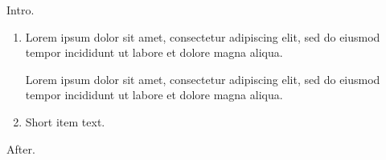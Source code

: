 \documentclass[10pt]{article}
\begin{document}
Intro.
\begin{enumerate}
\item Lorem ipsum dolor sit amet, consectetur adipiscing elit, sed do eiusmod tempor incididunt ut labore et dolore magna aliqua.

Lorem ipsum dolor sit amet, consectetur adipiscing elit, sed do eiusmod tempor incididunt ut labore et dolore magna aliqua.
\item Short item text.
\end{enumerate}
After.
\end{document}
